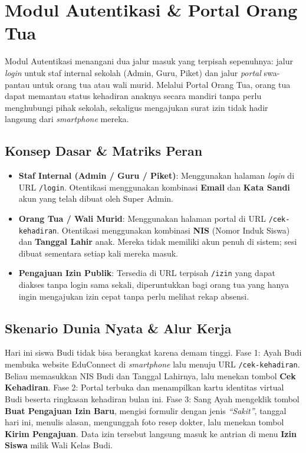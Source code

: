 \chapter{Modul Autentikasi \& Portal Orang Tua}

Modul Autentikasi menangani dua jalur masuk yang terpisah sepenuhnya: jalur \textit{login} untuk staf internal sekolah (Admin, Guru, Piket) dan jalur \textit{portal} swa-pantau untuk orang tua atau wali murid. Melalui Portal Orang Tua, orang tua dapat memantau status kehadiran anaknya secara mandiri tanpa perlu menghubungi pihak sekolah, sekaligus mengajukan surat izin tidak hadir langsung dari \textit{smartphone} mereka.

\section{Konsep Dasar \& Matriks Peran}
\begin{itemize}
    \item \textbf{Staf Internal (Admin / Guru / Piket)}: Menggunakan halaman \textit{login} di URL \texttt{/login}. Otentikasi menggunakan kombinasi \textbf{Email} dan \textbf{Kata Sandi} akun yang telah dibuat oleh Super Admin.
    \item \textbf{Orang Tua / Wali Murid}: Menggunakan halaman portal di URL \texttt{/cek-kehadiran}. Otentikasi menggunakan kombinasi \textbf{NIS} (Nomor Induk Siswa) dan \textbf{Tanggal Lahir} anak. Mereka tidak memiliki akun penuh di sistem; sesi dibuat sementara setiap kali mereka masuk.
    \item \textbf{Pengajuan Izin Publik}: Tersedia di URL terpisah \texttt{/izin} yang dapat diakses tanpa login sama sekali, diperuntukkan bagi orang tua yang hanya ingin mengajukan izin cepat tanpa perlu melihat rekap absensi.
\end{itemize}

\section{Skenario Dunia Nyata \& Alur Kerja}

Hari ini siswa Budi tidak bisa berangkat karena demam tinggi. Fase 1: Ayah Budi membuka website EduConnect di \textit{smartphone} lalu menuju URL \texttt{/cek-kehadiran}. Beliau memasukkan NIS Budi dan Tanggal Lahirnya, lalu menekan tombol \textbf{Cek Kehadiran}. Fase 2: Portal terbuka dan menampilkan kartu identitas virtual Budi beserta ringkasan kehadiran bulan ini. Fase 3: Sang Ayah mengeklik tombol \textbf{Buat Pengajuan Izin Baru}, mengisi formulir dengan jenis \textit{``Sakit''}, tanggal hari ini, menulis alasan, mengunggah foto resep dokter, lalu menekan tombol \textbf{Kirim Pengajuan}. Data izin tersebut langsung masuk ke antrian di menu \textbf{Izin Siswa} milik Wali Kelas Budi.

